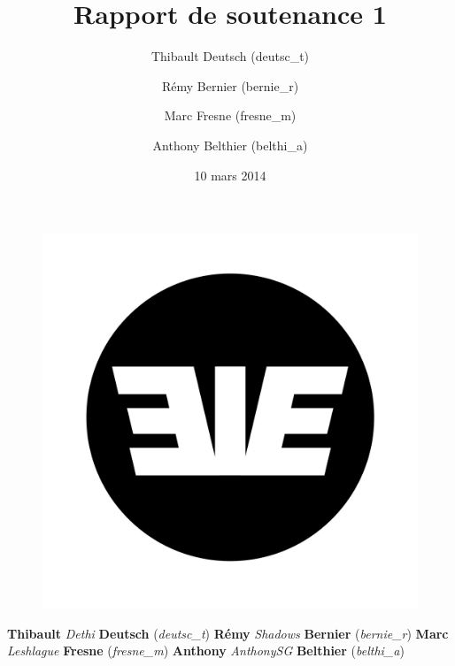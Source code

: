 \documentclass[11pt]{report}
\title{Rapport de soutenance 1}
\author{Thibault Deutsch (deutsc\_t) \and Rémy Bernier (bernie\_r) \and Marc Fresne (fresne\_m) \and Anthony Belthier (belthi\_a)}
\date{10 mars 2014}
\begin{document}

\thispagestyle{empty}
\begin{center}
{}
\par
\vspace*{0.5cm}
{}
\par
{\fontsize{15}{18}{{\textbf{\today}}}}
\end{center}

\vspace*{0.5cm}
\begin{figure}[htbp]
   \begin{center}
      \includegraphics[scale = 0.05]{eie.png}
   \end{center}
\end{figure}

\vspace*{0.5cm}
\par
\begin{center}
\fontsize{16}{20}
\textbf{Thibault }
\emph{Dethi }
\textbf{Deutsch}
(\emph{deutsc\_t})
\newline
\textbf{Rémy }
\emph{Shadows }
\textbf{Bernier}
(\emph{bernie\_r})
\newline
\textbf{Marc }
\emph{Leshlague }
\textbf{Fresne}
(\emph{fresne\_m})
\newline
\textbf{Anthony }
\emph{AnthonySG }
\textbf{Belthier}
(\emph{belthi\_a})
\newline
\end{center}
\end{document}
